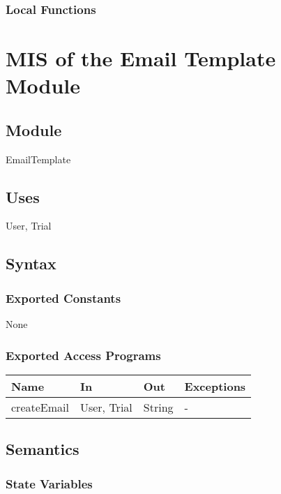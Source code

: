 \documentclass[12pt, titlepage]{article}
\begin{document}
\subsubsection{Local Functions}

\section{MIS of the Email Template Module} \label{EmailTemplate}

\subsection{Module}

EmailTemplate

\subsection{Uses}

User, Trial

\subsection{Syntax}

\subsubsection{Exported Constants}
None

\subsubsection{Exported Access Programs}

\begin{center}
\begin{tabular}{p{4cm} p{4cm} p{4cm} p{4cm}}
\hline
\textbf{Name} & \textbf{In} & \textbf{Out} & \textbf{Exceptions} \\
\hline
createEmail & User, Trial & String & - \\
\hline
\end{tabular}
\end{center}

\subsection{Semantics}

\subsubsection{State Variables}
\end{document}
